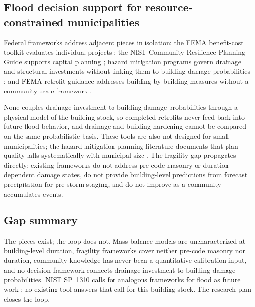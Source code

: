\documentclass[11pt]{article}
\begin{document}
\vspace{-0.3cm}
\subsection{Flood decision support for resource-constrained municipalities}
Federal frameworks address adjacent pieces in isolation: the FEMA benefit-cost
toolkit evaluates individual projects \cite{fema2019bcatoolkit}; the NIST
Community Resilience Planning Guide supports capital planning
\cite{mcallister2015nist1190v1,mcallister2015nist1190v2}; hazard mitigation
programs govern drainage and structural investments without linking them to
building damage probabilities \cite{fema2023hmaguide}; and FEMA retrofit guidance
addresses building-by-building measures without a community-scale framework
\cite{fema2014p312,fema2012p259}.

None couples drainage investment to building damage probabilities through a
physical model of the building stock, so completed retrofits never feed back
into future flood behavior, and drainage and building hardening cannot be
compared on the same probabilistic basis.
These tools are also not designed for small municipalities; the hazard mitigation
planning literature documents that plan quality falls systematically with
municipal size
\cite{smith2013statecapacity,horney2012ruralstatus,smith2026ruralcapacity}.
The fragility gap propagates directly: existing frameworks do not address
pre-code masonry or duration-dependent damage states, do not provide
building-level predictions from forecast precipitation for pre-storm staging,
and do not improve as a community accumulates events.

\vspace{-0.3cm}
\subsection{Gap summary}
The pieces exist; the loop does not. Mass balance models are uncharacterized at
building-level duration, fragility frameworks cover neither pre-code masonry nor
duration, community knowledge has never been a quantitative calibration input, and
no decision framework connects drainage investment to building damage probabilities.
NIST SP~1310 \cite{davis2024nist} calls for analogous frameworks for flood as
future work \cite[Sec.~6.1.2]{davis2024nist}; no existing tool answers that call
for this building stock. The research plan closes the loop.

\end{document}
